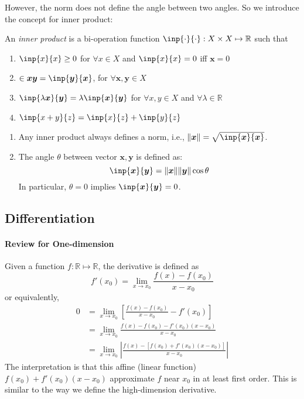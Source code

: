 However, the norm does not define the angle between two angles. So we introduce the concept for inner product:
\begin{definition}
An \emph{inner product} is a bi-operation function $\inp{\cdot}{\cdot}: X\times X\mapsto\mathbb{R}$ such that
\begin{enumerate}
\item
$\inp{x}{x}\ge0$ for $\forall x\in X$ and $\inp{x}{x}=0$ iff $\bm x=0$
\item
$\in{\bm x}{\bm y}=\inp{\bm y}{\bm x}$, for $\forall \bm x,\bm y\in X$
\item
$\inp{\lambda\bm x}{\bm y}=\lambda\inp{\bm x}{\bm y}$ for $\forall x,y\in X$ and $\forall \lambda\in\mathbb{R}$
\item
$\inp{x+y}{z}=\inp{x}{z}+\inp{y}{z}$
\end{enumerate}
\end{definition}
 \begin{remark}
 \begin{enumerate}
\item
 Any inner product always defines a norm, i.e., $\|\bm x\|=\sqrt{\inp{\bm x}{\bm x}}$.
 \item
The angle $\theta$ between vector $\bm x,\bm y$ is defined as:
\[
\inp{\bm x}{\bm y}=\|\bm x\|\|\bm y\|\cos\theta
\]
In particular, $\theta=0$ implies $\inp{\bm x}{\bm y}=0$.
\end{enumerate}
 \end{remark}
\subsection{Differentiation}
\paragraph{Review for One-dimension}
Given a function $f:\mathbb{R}\mapsto\mathbb{R}$, the derivative is defined as
\[
f'(x_0)=\lim_{x\to x_0}\frac{f(x) - f(x_0)}{x-x_0}
\]
or equivalently,
\begin{align*}
0&=
\lim_{x\to x_0}\left[\frac{f(x) - f(x_0)}{x-x_0} - f'(x_0)\right]\\
&=
\lim_{x\to x_0}\frac{f(x) - f(x_0) - f'(x_0)(x-x_0)}{x-x_0}\\
&=
\lim_{x\to x_0}
\left|
\frac{
f(x) - [f(x_0) + f'(x_0)(x-x_0)]
}{x-x_0}
\right|
\end{align*}
The interpretation is that this affine (linear function) $f(x_0)+f'(x_0)(x-x_0)$ approximate $f$ near $x_0$ in at least first order. This is similar to the way we define the high-dimension derivative.
